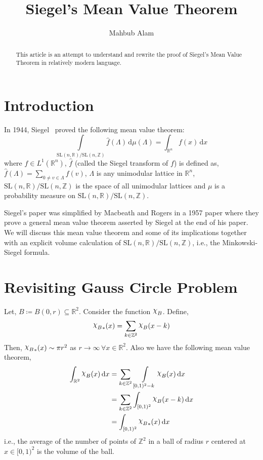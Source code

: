 \documentclass[11pt]{article}
\theoremstyle{definition}
\newcommand{\mychi}{\raisebox{2pt}{$\chi$}}
\begin{document}
\title{\bfseries Siegel's Mean Value Theorem}

\author{Mahbub Alam}

\date{}

\maketitle

\begin{abstract}
    This article is an attempt to understand and rewrite the proof of Siegel's Mean Value Theorem in relatively modern language.
\end{abstract}

\section{Introduction}
In 1944, Siegel~\cite{siegel45} proved the following mean value theorem:
\[
    \int\limits_{\mathrm{SL}(n,\mathbb{R}) / \mathrm{SL}(n,\mathbb{Z})} \widehat{f}(\Lambda  ) \, \mathrm{d} \mu (\Lambda  ) = \int_{\mathbb{R}^n}f(x) \, \mathrm{d} x
\]
where $f\in L^1(\mathbb{R}^n )$, $\widehat{f}$ (called the Siegel transform of $f$) is defined as, $\widehat{f}( \Lambda ) = \displaystyle\sum_{0 \neq v \in \Lambda } f(v)$, $\Lambda$ is any unimodular lattice in $\mathbb{R}^{n}$, $\mathrm{SL}(n, \mathbb{R})/ \mathrm{SL}(n, \mathbb{Z})$ is the space of all unimodular lattices and $\mu$ is a probability measure on $\mathrm{SL}(n,\mathbb{R})/\mathrm{SL}(n,\mathbb{Z})$.

Siegel's paper was simplified by Macbeath and Rogers \cite{macbeathrogers58} in a 1957 paper where they prove a general mean value theorem asserted by Siegel at the end of his paper.
We will discuss this mean value theorem and some of its implications together with an explicit volume calculation of $\mathrm{SL}(n,\mathbb{R})/\mathrm{SL}(n,\mathbb{Z})$, i.e., the Minkowski-Siegel formula.

\section{Revisiting Gauss Circle Problem}
Let, $B \coloneqq B(0, r) \subseteq \mathbb{R}^2$.
Consider the function $\mychi _B$.
Define,
\[
    {\mychi _B}_*(x) = \sum_{k \in \mathbb{Z}^2} \mychi _B(x-k)
\]
Then, ${\mychi _B}_*(x) \sim \pi r^2$ as $r \to \infty\, \forall x \in \mathbb{R}^2$.
Also we have the following mean value theorem,
\begin{align*}
    \int_{\mathbb{R}^2} \mychi _B (x)\, \mathrm{d} x &= \displaystyle\sum_{k \in \mathbb{Z}^2} \, \int\limits_{[0,1)^2 - k} \mychi _B (x) \, \mathrm{d} x\\
    &= \displaystyle\sum_{k \in \mathbb{Z}^2} \int_{[0,1)^2} \mychi _B (x-k) \, \mathrm{d} x\\
    &= \int_{[0,1)^2} {\mychi _B}_*(x) \, \mathrm{d} x
\end{align*}
i.e., the average of the number of points of $\mathbb{Z}^2$ in a ball of radius $r$ centered at $x \in [0,1)^2$ is the volume of the ball.
\end{document}
